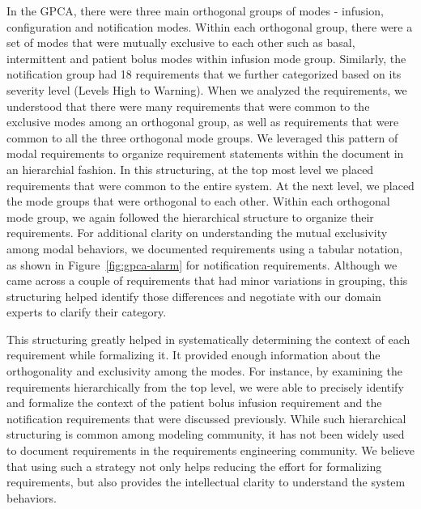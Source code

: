 In the GPCA, there were three main orthogonal groups of modes - infusion, configuration and notification modes. Within each orthogonal group, there were a set of modes that were mutually exclusive to each other such as basal, intermittent and patient bolus modes within infusion mode group. Similarly, the notification group had 18 requirements that we further categorized based on its severity level (Levels High to Warning). When we analyzed the requirements, we understood that there were many requirements that were common to the exclusive modes among an orthogonal group, as well as requirements that were common to all the three orthogonal mode groups. We leveraged this pattern of modal requirements to organize requirement statements within the document in an hierarchial fashion. In this structuring, at the top most level we placed requirements that were common to the entire system. At the next level, we placed the mode groups that were orthogonal to each other. Within each orthogonal mode group, we again followed the hierarchical structure to organize their requirements. %
For additional clarity on understanding the mutual exclusivity among modal behaviors, we documented requirements using a tabular notation, as shown in Figure~\ref{fig:gpca-alarm} for notification requirements. Although we came across a couple of requirements that had minor variations in grouping, this structuring helped identify those differences and negotiate with our domain experts to clarify their category.
%
%
%


This structuring greatly helped in systematically determining the context of each requirement while formalizing it. It provided enough information about the orthogonality and exclusivity among the modes. For instance, by examining the requirements hierarchically from the top level, we were able to precisely identify and formalize the context of the patient bolus infusion requirement and the notification requirements that were discussed previously. While such hierarchical structuring is common among modeling community, it has not been widely used to document requirements in the requirements engineering community. We believe that using such a strategy not only helps reducing the effort for formalizing requirements, but also provides the intellectual clarity to understand the system behaviors.

